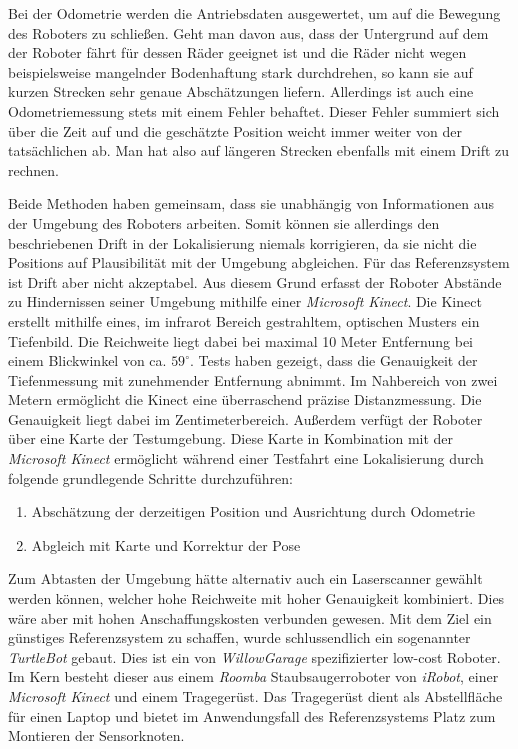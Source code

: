 Bei der Odometrie werden die Antriebsdaten ausgewertet, um auf die Bewegung
des Roboters zu schließen. Geht man davon aus, dass der Untergrund auf dem der
Roboter fährt für dessen Räder geeignet ist und die Räder nicht wegen
beispielsweise mangelnder Bodenhaftung stark durchdrehen, so kann sie auf
kurzen Strecken sehr genaue Abschätzungen liefern. Allerdings ist auch eine
Odometriemessung stets mit einem Fehler behaftet. Dieser Fehler summiert sich
über die Zeit auf und die geschätzte Position weicht immer weiter von der
tatsächlichen ab. Man hat also auf längeren Strecken ebenfalls mit einem Drift
zu rechnen.

Beide Methoden haben gemeinsam, dass sie unabhängig von Informationen aus der
Umgebung des Roboters arbeiten. Somit können sie allerdings den beschriebenen
Drift in der Lokalisierung niemals korrigieren, da sie nicht die Positions auf
Plausibilität mit der Umgebung abgleichen.  Für das Referenzsystem ist Drift
aber nicht akzeptabel. Aus diesem Grund erfasst der Roboter Abstände zu
Hindernissen seiner Umgebung mithilfe einer \textit{Microsoft Kinect}. Die
Kinect erstellt mithilfe eines, im infrarot Bereich gestrahltem, optischen
Musters ein Tiefenbild.  Die Reichweite liegt dabei bei maximal 10 Meter
Entfernung bei einem Blickwinkel von ca. $59^{\circ}$.
Tests haben gezeigt, dass die Genauigkeit der Tiefenmessung mit zunehmender
Entfernung abnimmt. Im Nahbereich von zwei Metern ermöglicht die Kinect eine überraschend präzise
Distanzmessung. Die Genauigkeit liegt dabei im Zentimeterbereich.  Außerdem verfügt der Roboter
über eine Karte der Testumgebung. Diese Karte in Kombination mit der
\textit{Microsoft Kinect} ermöglicht während einer Testfahrt eine Lokalisierung
durch folgende grundlegende Schritte durchzuführen:

\begin{enumerate}
  \item Abschätzung der derzeitigen Position und Ausrichtung durch Odometrie
  \item Abgleich mit Karte und Korrektur der Pose
\end{enumerate}

Zum Abtasten der Umgebung hätte alternativ auch ein Laserscanner gewählt werden
können, welcher hohe Reichweite mit hoher Genauigkeit kombiniert. Dies wäre
aber mit hohen Anschaffungskosten verbunden gewesen. Mit dem Ziel ein günstiges
Referenzsystem zu schaffen, wurde schlussendlich ein sogenannter
\textit{TurtleBot} gebaut. Dies ist ein von \textit{WillowGarage}
spezifizierter low-cost Roboter.
Im Kern besteht dieser aus einem \textit{Roomba} Staubsaugerroboter von
\textit{iRobot}, einer \textit{Microsoft Kinect} und einem Tragegerüst. Das
Tragegerüst dient als Abstellfläche für einen Laptop und bietet im
Anwendungsfall des Referenzsystems Platz zum Montieren der Sensorknoten.

